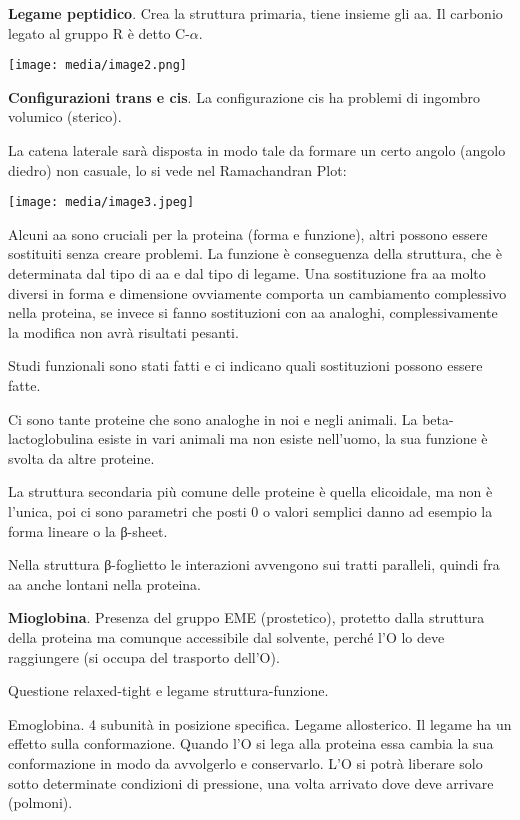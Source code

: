 \textbf{Legame peptidico}. Crea la struttura primaria, tiene insieme gli
aa. Il carbonio legato al gruppo R è detto C-\(\alpha\).

\texttt{[image: media/image2.png]}

\textbf{Configurazioni trans e cis}. La configurazione cis ha problemi
di ingombro volumico (sterico).

La catena laterale sarà disposta in modo tale da formare un certo angolo
(angolo diedro) non casuale, lo si vede nel Ramachandran Plot:

\texttt{[image: media/image3.jpeg]}

Alcuni aa sono cruciali per la proteina (forma e funzione), altri
possono essere sostituiti senza creare problemi. La funzione è
conseguenza della struttura, che è determinata dal tipo di aa e dal tipo
di legame. Una sostituzione fra aa molto diversi in forma e dimensione
ovviamente comporta un cambiamento complessivo nella proteina, se invece
si fanno sostituzioni con aa analoghi, complessivamente la modifica non
avrà risultati pesanti.

Studi funzionali sono stati fatti e ci indicano quali sostituzioni
possono essere fatte.

Ci sono tante proteine che sono analoghe in noi e negli animali. La
beta-lactoglobulina esiste in vari animali ma non esiste nell'uomo, la
sua funzione è svolta da altre proteine.

La struttura secondaria più comune delle proteine è quella elicoidale,
ma non è l'unica, poi ci sono parametri che posti 0 o valori semplici
danno ad esempio la forma lineare o la β-sheet.

Nella struttura β-foglietto le interazioni avvengono sui tratti
paralleli, quindi fra aa anche lontani nella proteina.

\textbf{Mioglobina}. Presenza del gruppo EME (prostetico), protetto
dalla struttura della proteina ma comunque accessibile dal solvente,
perché l'O lo deve raggiungere (si occupa del trasporto dell'O).

Questione relaxed-tight e legame struttura-funzione.

Emoglobina. 4 subunità in posizione specifica. Legame allosterico. Il
legame ha un effetto sulla conformazione. Quando l'O si lega alla
proteina essa cambia la sua conformazione in modo da avvolgerlo e
conservarlo. L'O si potrà liberare solo sotto determinate condizioni di
pressione, una volta arrivato dove deve arrivare (polmoni).

